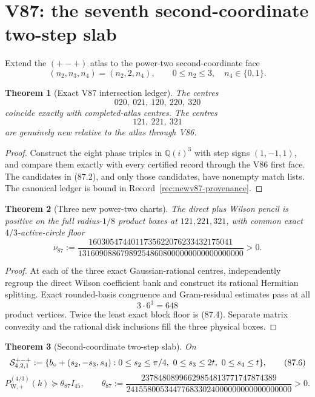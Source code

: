 \documentclass[11pt,oneside]{article}
\newtheorem{theorem}{Theorem}[section]
\theoremstyle{definition}
\theoremstyle{remark}
\begin{document}
\section{V87: the seventh second-coordinate two-step slab}
\label{sec:newv87-seventh-second-slab}

Extend the \((+-+)\) atlas to the power-two second-coordinate face
\[
 (n_2,n_3,n_4)=(n_2,2,n_4),\qquad
 0\leq n_2\leq3,\quad n_4\in\{0,1\}.                 \tag{87.1}
\]

\begin{theorem}[Exact V87 intersection ledger]
\label{thm:newv87-intersection}
The centres
\[
 020,\ 021,\ 120,\ 220,\ 320                         \tag{87.2}
\]
coincide exactly with completed-atlas centres.  The centres
\[
 121,\ 221,\ 321                                     \tag{87.3}
\]
are genuinely new relative to the atlas through V86.
\end{theorem}

\begin{proof}
Construct the eight phase triples in \(\mathbb Q(i)^3\) with step
signs \((1,-1,1)\), and compare them exactly with every certified
record through the V86 first face.  The candidates in (87.2), and
only those candidates, have nonempty match lists.  The canonical
ledger is bound in Record~\ref{rec:newv87-provenance}.
\end{proof}

\begin{theorem}[Three new power-two charts]
\label{thm:newv87-three-charts}
The direct plus Wilson pencil is positive on the full
radius-\(1/8\) product boxes at \(121,221,321\), with common exact
\(4/3\)-active-circle floor
\[
\nu_{87}:=
\frac{1603054744011735622076233432175041}
     {131609088679892548608000000000000000000}>0.     \tag{87.4}
\]
\end{theorem}

\begin{proof}
At each of the three exact Gaussian-rational centres, independently
regroup the direct Wilson coefficient bank and construct its
rational Hermitian splitting.  Exact rounded-basis congruence and
Gram-residual estimates pass at all
\[
 3\cdot6^3=648                                        \tag{87.5}
\]
product vertices.  Twice the least exact block floor is (87.4).
Separate matrix convexity and the rational disk inclusions fill the
three physical boxes.
\end{proof}

\begin{theorem}[Second-coordinate two-step slab]
\label{thm:newv87-two-step-slab}
On
\[
 {\cal S}^{+-+}_{4,2,1}:=
 \{b_\circ+(s_2,-s_3,s_4):
 0\leq s_2\leq\pi/4,\ 0\leq s_3\leq2t,\
 0\leq s_4\leq t\},                                   \tag{87.6}
\]
\[
 P_{\mathrm W,+}^{(4/3)}(k)
 \succeq\theta_{87}I_{45},\qquad
 \theta_{87}:=
 \frac{23784808996629854813771747874389}
 {241558005344776833024000000000000000000}>0.         \tag{87.7}
\]
\end{theorem}
\end{document}
